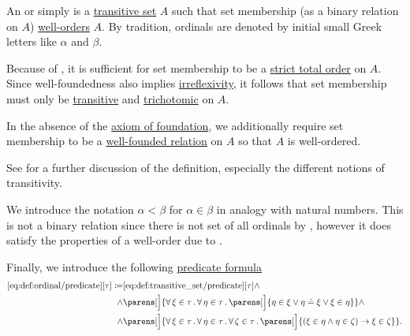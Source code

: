 \begin{definition}\label{def:ordinal}
  An  or simply  is a \hyperref[def:transitive_set]{transitive set} \( A \) such that set membership (as a binary relation on \( A \)) \hyperref[def:well_ordered_set]{well-orders} \( A \). By tradition, ordinals are denoted by initial small Greek letters like \( \alpha \) and \( \beta \).

  Because of , it is sufficient for set membership to be a \hyperref[def:totally_ordered_set]{strict total order} on \( A \). Since well-foundedness also implies \hyperref[def:binary_relation/irreflexive]{irreflexivity}, it follows that set membership must only be \hyperref[def:binary_relation/transitive]{transitive} and \hyperref[def:binary_relation/trichotomic]{trichotomic} on \( A \).

  In the absence of the \hyperref[def:zfc/foundation]{axiom of foundation}, we additionally require set membership to be a \hyperref[def:well_founded_relation]{well-founded relation} on \( A \) so that \( A \) is well-ordered.

  See  for a further discussion of the definition, especially the different notions of transitivity.

  We introduce the notation \( \alpha < \beta \) for \( \alpha \in \beta \) in analogy with natural numbers. This is not a binary relation since there is not set of all ordinals by , however it does satisfy the properties of a well-order due to .

  Finally, we introduce the following \hyperref[rem:predicate_formula]{predicate formula}
  \begin{equation*}\taglabel[\op{IsOrdinal}]{eq:def:ordinal/predicate}
    \begin{aligned}
      \ref{eq:def:ordinal/predicate}[\tau] \coloneqq
        &\ref{eq:def:transitive_set/predicate}[\tau]
        \wedge \\ \wedge&
        \parens[\Big]
        {
          \qforall {\xi \in \tau}
          \qforall {\eta \in \tau}
          \parens[\Big]
            {
              \eta \in \xi \vee \eta \doteq \xi \vee \xi \in \eta
            }
        }
        \wedge \\ \wedge&
        \parens[\Big]
        {
          \qforall {\xi \in \tau}
          \qforall {\eta \in \tau}
          \qforall {\zeta \in \tau}
          \parens[\Big]
          {
            (\xi \in \eta \wedge \eta \in \zeta) \rightarrow \xi \in \zeta
          }
        }.
    \end{aligned}
  \end{equation*}
\end{definition}

